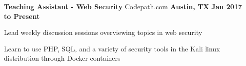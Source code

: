 \begin{cventries}
	\cventry
		{\normalsize \textbf{Teaching Assistant - Web Security}}
		{\large Codepath.com}
		{\normalsize \textbf{Austin, TX}}
		{\normalsize \textbf{Jan 2017 to Present}}
		{
			\begin{cvitems}
				\item {\normalsize Lead weekly discussion sessions overviewing topics in web security}
                \item {\normalsize Learn to use PHP, SQL, and a variety of security tools in the Kali linux distribution through Docker containers} 
			\end{cvitems}
		}
\end{cventries}
